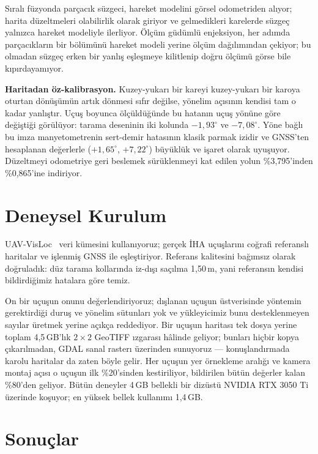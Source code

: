 \documentclass[conference]{IEEEtran}
\begin{document}
Sıralı füzyonda parçacık süzgeci, hareket modelini görsel odometriden alıyor;
harita düzeltmeleri olabilirlik olarak giriyor ve gelmedikleri karelerde süzgeç
yalnızca hareket modeliyle ilerliyor. Ölçüm güdümlü enjeksiyon, her adımda
parçacıkların bir bölümünü hareket modeli yerine ölçüm dağılımından çekiyor; bu
olmadan süzgeç erken bir yanlış eşleşmeye kilitlenip doğru ölçümü görse bile
kıpırdayamıyor.

\textbf{Haritadan öz-kalibrasyon.} Kuzey-yukarı bir kareyi kuzey-yukarı bir
karoya oturtan dönüşümün artık dönmesi sıfır değilse, yönelim açısının kendisi
tam o kadar yanlıştır. Uçuş boyunca ölçüldüğünde bu hatanın uçuş yönüne göre
değiştiği görülüyor: tarama deseninin iki kolunda $-1{,}93^\circ$ ve
$-7{,}08^\circ$. Yöne bağlı bu imza manyetometrenin sert-demir hatasının klasik
parmak izidir ve GNSS'ten hesaplanan değerlerle ($+1{,}65^\circ$,
$+7{,}22^\circ$) büyüklük ve işaret olarak uyuşuyor. Düzeltmeyi odometriye geri
beslemek sürüklenmeyi kat edilen yolun \%3,795'inden \%0,865'ine indiriyor.

\section{Deneysel Kurulum}

UAV-VisLoc~\cite{uavvisloc} veri kümesini kullanıyoruz; gerçek İHA uçuşlarını
coğrafi referanslı haritalar ve işlenmiş GNSS ile eşleştiriyor. Referans
kalitesini bağımsız olarak doğruladık: düz tarama kollarında iz-dışı saçılma
1,50\,m, yani referansın kendisi bildirdiğimiz hatalara göre temiz.

On bir uçuşun onunu değerlendiriyoruz; dışlanan uçuşun üstverisinde yöntemin
gerektirdiği duruş ve yönelim sütunları yok ve yükleyicimiz bunu desteklenmeyen
sayılar üretmek yerine açıkça reddediyor. Bir uçuşun haritası tek dosya yerine
toplam 4,5\,GB'lık $2\times2$ GeoTIFF ızgarası hâlinde geliyor; bunları hiçbir
kopya çıkarılmadan, GDAL sanal rasterı üzerinden sunuyoruz --- konuşlandırmada
karolu haritalar da zaten böyle gelir. Her uçuşun yer örnekleme aralığı ve
kamera montaj açısı o uçuşun ilk \%20'sinden kestiriliyor, bildirilen bütün
değerler kalan \%80'den geliyor. Bütün deneyler 4\,GB bellekli bir dizüstü
NVIDIA RTX 3050 Ti üzerinde koşuyor; en yüksek bellek kullanımı 1,4\,GB.

\section{Sonuçlar}
\label{sec:sonuclar}
\end{document}
